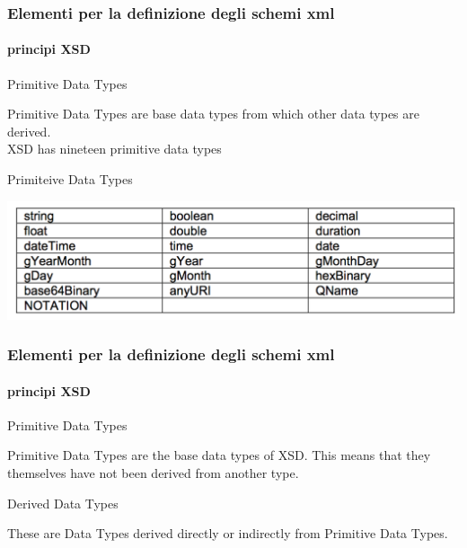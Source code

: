 \begin{frame}
	\frametitle{Elementi per la definizione degli schemi xml}
	\framesubtitle{principi XSD}
	\addtocounter{nframe}{1}

	\begin{block}{Primitive Data Types}

		Primitive Data Types are base data types from which other data types are derived.
		\\XSD has nineteen primitive data types

	\end{block}

	\begin{block}{Primiteive Data Types}

		\includegraphics[width=.95\textwidth]{imgs/TabellaDataTypeXSD.png}

	\end{block}

\end{frame}

\begin{frame}
	\frametitle{Elementi per la definizione degli schemi xml}
	\framesubtitle{principi XSD}
	\addtocounter{nframe}{1}

	\begin{block}{Primitive Data Types}


		Primitive Data Types are the base data types of XSD. This means that they themselves have not been derived from another type.


	\end{block}

	\begin{block}{Derived Data Types}

		These are Data Types derived directly or indirectly from Primitive Data Types.

	\end{block}

\end{frame}


